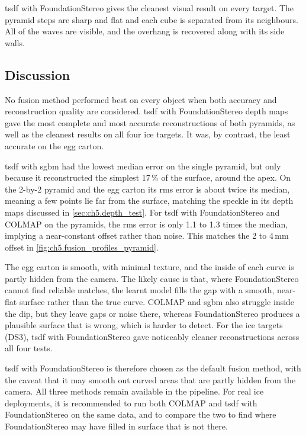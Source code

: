    \Gls{tsdf} with FoundationStereo gives the cleanest visual result on every target.
   The pyramid steps are sharp and flat and each cube is separated from its neighbours. All of the waves are visible, 
   and the overhang is recovered along with its side walls. 


\subsection{Discussion}
\label{subsec:ch5.fusion_discussion}
No fusion method performed best on every object when both accuracy and reconstruction quality are considered.
\Gls{tsdf} with FoundationStereo depth maps gave the most complete and most accurate reconstructions of both pyramids,
as well as the cleanest results on all four ice targets. It was, by contrast, the least accurate on the egg carton.

\Gls{tsdf} with \gls{sgbm} had the lowest median error on the single pyramid, but only because it reconstructed the simplest
17\,\% of the surface, around the apex. On the 2-by-2 pyramid and the egg carton its \gls{rms} error is about twice
its median, meaning a few points lie far from the surface, matching the speckle in its depth maps discussed in
\autoref{sec:ch5.depth_test}. For \gls{tsdf} with FoundationStereo and COLMAP on the pyramids, the \gls{rms} error is only
1.1 to 1.3 times the median, implying a near-constant offset rather than noise. This matches the 2 to 4\,mm offset
in \autoref{fig:ch5.fusion_profiles_pyramid}. 

The egg carton is smooth, with minimal texture, and the inside of each curve is partly hidden from the camera.
The likely cause is that, where FoundationStereo cannot find reliable matches, the learnt model fills the gap with
a smooth, near-flat surface rather than the true curve. COLMAP and \gls{sgbm} also struggle inside the dip, but they leave
gaps or noise there, whereas FoundationStereo produces a plausible surface that is wrong, which is harder to detect.
For the ice targets (DS3), \gls{tsdf} with FoundationStereo gave noticeably cleaner reconstructions across all four tests.

\Gls{tsdf} with FoundationStereo is therefore chosen as the default fusion method, with the caveat that it may smooth
out curved areas that are partly hidden from the camera. All three methods remain available in the pipeline. For
real ice deployments, it is recommended to run both COLMAP and \gls{tsdf} with FoundationStereo on the same data, and to
compare the two to find where FoundationStereo may have filled in surface that is not there.


